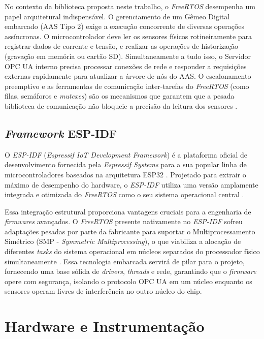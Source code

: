 No contexto da biblioteca proposta neste trabalho, o \textit{FreeRTOS} desempenha um papel arquitetural indispensável. O gerenciamento de um Gêmeo Digital embarcado (AAS Tipo 2) exige a execução concorrente de diversas operações assíncronas. O microcontrolador deve ler os sensores físicos rotineiramente para registrar dados de corrente e tensão, e realizar as operações de historização (gravação em memória ou cartão SD). Simultaneamente a tudo isso, o Servidor OPC UA interno precisa processar conexões de rede e responder a requisições externas rapidamente para atualizar a árvore de nós do AAS. O escalonamento preemptivo e as ferramentas de comunicação inter-tarefas do \textit{FreeRTOS} (como filas, semáforos e \textit{mutexes}) são os mecanismos que garantem que a pesada biblioteca de comunicação não bloqueie a precisão da leitura dos sensores \cite{barry2016}.

\subsection{\textit{Framework} ESP-IDF}

O \textit{ESP-IDF} (\textit{Espressif IoT Development Framework}) é a plataforma oficial de desenvolvimento fornecida pela \textit{Espressif Systems} para a sua popular linha de microcontroladores baseados na arquitetura ESP32 \cite{espressif2026}. Projetado para extrair o máximo de desempenho do hardware, o \textit{ESP-IDF} utiliza uma versão amplamente integrada e otimizada do \textit{FreeRTOS} como o seu sistema operacional central \cite{espressif2026}.

Essa integração estrutural proporciona vantagens cruciais para a engenharia de \textit{firmwares} avançados. O \textit{FreeRTOS} presente nativamente no \textit{ESP-IDF} sofreu adaptações pesadas por parte da fabricante para suportar o Multiprocessamento Simétrico (SMP - \textit{Symmetric Multiprocessing}), o que viabiliza a alocação de diferentes \textit{tasks} do sistema operacional em núcleos separados do processador físico simultaneamente \cite{espressif2026}. Essa tecnologia embarcada servirá de pilar para o projeto, fornecendo uma base sólida de \textit{drivers}, \textit{threads} e rede, garantindo que o \textit{firmware} opere com segurança, isolando o protocolo OPC UA em um núcleo enquanto os sensores operam livres de interferência no outro núcleo do chip.

\section{Hardware e Instrumentação}


